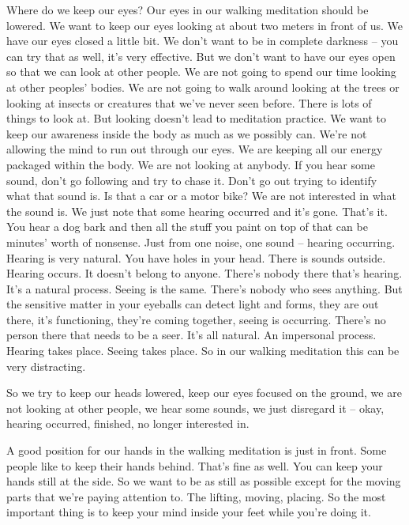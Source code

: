 \documentclass[letterpaper,10pt,english]{sphinxmanual}
\begin{document}
\sphinxAtStartPar
Where  do  we  keep  our  eyes?  Our  eyes  in  our  walking  meditation
should be lowered. We want to keep our eyes looking at about two meters
in front of us. We have our eyes closed a little bit. We don’t want to be in
complete darkness – you can try that as well, it’s very effective. But we don’t
want to have our eyes open so that we can look at other people. We are not
going to spend our time looking at other peoples’ bodies. We are not going to
walk around looking at the trees or looking at insects or creatures that we’ve
never seen before. There is lots of things to look at. But looking doesn’t lead
to meditation practice. We want to keep our awareness inside the body as
much as we possibly can. We’re not allowing the mind to run out through
our eyes. We are keeping all our energy packaged within the body. We are
not looking at anybody. If you hear some sound, don’t go following and try
to chase it. Don’t go out trying to identify what that sound is. Is that a car or
  a motor bike? We are not interested in what the sound is. We just note that
some hearing occurred and it’s gone. That’s it. You hear a dog bark and then
all the stuff you paint on top of that can be minutes’ worth of nonsense. Just
from one noise, one sound – hearing occurring. Hearing is very natural. You
have holes in your head. There is sounds outside. Hearing occurs. It doesn’t
belong to anyone. There’s nobody there that’s hearing. It’s a natural process.
Seeing  is  the  same.  There’s  nobody  who  sees  anything.  But  the  sensitive
matter  in  your  eyeballs  can  detect  light  and  forms,  they  are  out  there,  it’s
functioning, they’re coming together, seeing is occurring. There’s no person
there that needs to be a seer. It’s all natural. An impersonal process. Hearing
takes  place.  Seeing  takes  place.  So  in  our  walking  meditation  this  can  be
very distracting.

\sphinxAtStartPar
So  we  try  to  keep  our  heads  lowered,  keep  our  eyes  focused  on  the
ground, we are not looking at other people, we hear some sounds, we just
disregard it – okay, hearing occurred, finished, no longer interested in.

\sphinxAtStartPar
A good position for our hands in the walking meditation is just in front.
Some people like to keep their hands behind. That’s fine as well. You can
keep your hands still at the side. So we want to be as still as possible except
for  the  moving  parts  that  we’re  paying  attention  to.  The  lifting,  moving,
placing. So the most important thing is to keep your mind inside your feet
while you’re doing it.
\end{document}
